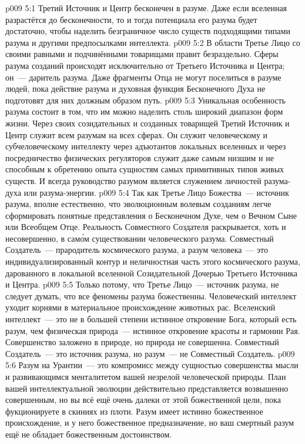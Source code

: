 \vs p009 5:1 Третий Источник и Центр бесконечен в разуме. Даже если вселенная разрастётся до бесконечности, то и тогда потенциала его разума будет достаточно, чтобы наделить безграничное число существ подходящими типами разума и другими предпосылками интеллекта.
\vs p009 5:2 В области  Третье Лицо со своими равными и подчинёнными товарищами правит безраздельно. Сферы разума созданий происходят исключительно от Третьего Источника и Центра; он~--- даритель разума. Даже фрагменты Отца не могут поселиться в разуме людей, пока действие разума и духовная функция Бесконечного Духа не подготовят для них должным образом путь.
\vs p009 5:3 Уникальная особенность разума состоит в том, что им можно наделить столь широкий диапазон форм жизни. Через своих созидательных и созданных товарищей Третий Источник и Центр служит всем разумам на всех сферах. Он служит человеческому и субчеловеческому интеллекту через адъютантов локальных вселенных и через посредничество физических регуляторов служит даже самым низшим и не способным к обретению опыта сущностям самых примитивных типов живых существ. И всегда руководство разумом является служением личностей разума\hyp{}духа или разума\hyp{}энергии.
\vs p009 5:4 \pc Так как Третье Лицо Божества~--- источник разума, вполне естественно, что эволюционным волевым созданиям легче сформировать понятные представления о Бесконечном Духе, чем о Вечном Сыне или Всеобщем Отце. Реальность Совместного Создателя раскрывается, хоть и несовершенно, в сам\'ом существовании человеческого разума. Совместный Создатель~--- прародитель космического разума, а разум человека~--- это индивидуализированный контур и неличностная часть этого космического разума, дарованного в локальной вселенной Созидательной Дочерью Третьего Источника и Центра.
\vs p009 5:5 \pc Только потому, что Третье Лицо~--- источник разума, не следует думать, что все феномены разума божественны. Человеческий интеллект уходит корнями в материальное происхождение животных рас. Вселенский интеллект~--- это не в большей степени истинное откровение Бога, который есть разум, чем физическая природа~--- истинное откровение красоты и гармонии Рая. Совершенство заложено в природе, но природа не совершенна. Совместный Создатель~--- это источник разума, но разум~--- не Совместный Создатель.
\vs p009 5:6 Разум на Урантии~--- это компромисс между сущностью совершенства мысли и развивающимся менталитетом вашей незрелой человеческой природы. План вашей интеллектуальной эволюции действительно представляется возвышенно совершенным, но вы всё ещё очень далеки от этой божественной цели, пока фукционируете в скиниях из плоти. Разум имеет истинно божественное происхождение, и у него божественное предназначение, но ваш смертный разум ещё не обладает божественным достоинством.

